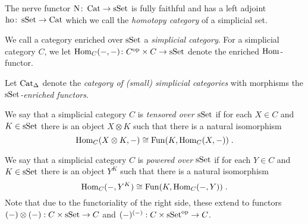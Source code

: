 \begin{lemma}\label{lem:nerveFF}
    The nerve functor $\operatorname{N}\colon\operatorname{Cat}\to\operatorname{sSet}$ is fully faithful and has a left adjoint $\operatorname{ho}\colon\operatorname{sSet}\to\operatorname{Cat}$ which we call the \emph{homotopy category} of a simplicial set.
    \begin{reference}
        \cite[Proposition 1.2.2.1]{kerodon}
    \end{reference}
\end{lemma}
\begin{definition}
    We call a category enriched over $\operatorname{sSet}$ a \emph{simplicial category}.
    For a simplicial category $C$, we let $\operatorname{Hom}_C(-,-)\colon C^{\operatorname{op}}\times C\to\operatorname{sSet}$ denote the enriched $\operatorname{Hom}$-functor.
   
    Let $\operatorname{Cat}_{\Delta}$ denote the \emph{category of (small) simplicial categories} with morphisms the \emph{$\operatorname{sSet}$-enriched functors}.
    
    We say that a simplicial category $C$ is \emph{tensored over $\operatorname{sSet}$} if for each $X\in C$ and $K\in\operatorname{sSet}$ there is an object $X\otimes K$ such that there is a natural isomorphism
    \begin{equation*}
        \operatorname{Hom}_C(X\otimes K,-)\cong\operatorname{Fun}(K,\operatorname{Hom}_C(X,-))\;.
    \end{equation*}

    We say that a simplicial category $C$ is \emph{powered over $\operatorname{sSet}$} if for each $Y\in C$ and $K\in\operatorname{sSet}$ there is an object $Y^K$ such that there is a natural isomorphism
    \begin{equation*}
        \operatorname{Hom}_C(-,Y^K)\cong\operatorname{Fun}(K,\operatorname{Hom}_C(-,Y))\;.
    \end{equation*}
    Note that due to the functoriality of the right side, these extend to functors $(-)\otimes(-):C\times\operatorname{sSet}\to C$ and $(-)^{(-)}:C\times\operatorname{sSet}^{\operatorname{op}}\to C$.
\end{definition}
